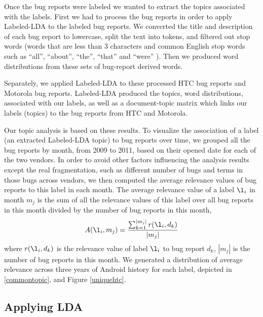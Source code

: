 \documentclass[10pt, conference, compsocconf]{IEEEtran}
\begin{document}
Once the bug reports were labeled we wanted to extract the topics
associated with the labels. First we had to process the bug reports 
in order to apply Labeled-LDA to the labeled bug reports. 
We converted the title and description of each bug report to lowercase,
split the text into tokens, and filtered out stop words (words that are less than 3 characters and
common English stop words such as ``all'', ``about'', ``the'',
``that'' and ``were'' ). Then we produced word distributions from
these sets of bug-report derived words.

Separately, we applied Labeled-LDA to these processed HTC bug reports and Motorola bug reports.
Labeled-LDA produced the topics, word distributions, associated
with our labels, as well as a document-topic matrix which links our
labels (topics) to the bug reports from HTC and Motorola.

Our topic analysis is based on these results. 
To visualize the association of a label (an extracted
Labeled-LDA topic) to bug reports over time,
we grouped
all the bug reports by month, from 2009 to 2011, based on their opened
date for each of the two vendors.
In order to avoid other factors influencing the analysis results except the real fragmentation,
such as different number of bugs and terms in those bugs across vendors,
we then computed the average relevance values of bug
reports to this label in each month. 
The average relevance value of a label \begin{math} \l_i \end{math} in
month \begin{math} m_j \end{math} is the sum of all the relevance
values of this label over all bug reports in this month divided by the
number of bug reports in this month,
\begin{equation}
A(\l_i,m_j) = \frac{\sum_{\substack{k=1}}^{|m_j|}r(\l_i,d_k)}{|m_j|}
\label{equation1}
\end{equation}
where $r(\l_i,d_k)$ is the relevance value of label $\l_i$ to bug
report $d_k$, $|m_j|$ is the number of bug reports in this month. 
We generated a distribution of average relevance across three years of
Android history for 
each label, depicted in  \ref{commontopic}, and
Figure \ref{uniquehtc}.


\subsection{Applying LDA}
\end{document}
